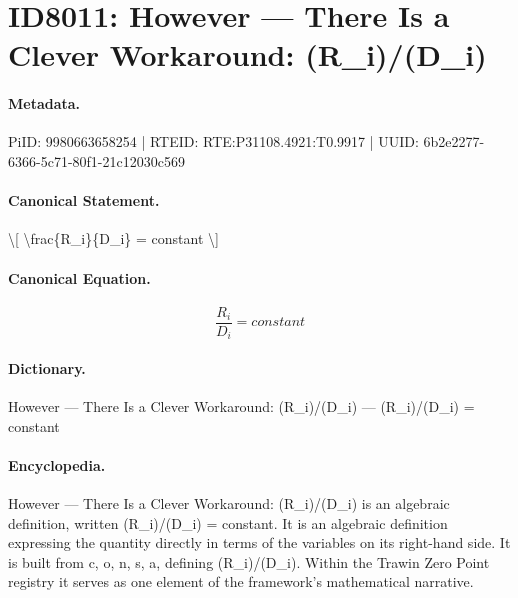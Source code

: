 \section*{ID8011: However — There Is a Clever Workaround: (R\_i)/(D\_i)}
\paragraph{Metadata.}
PiID: 9980663658254 | RTEID: RTE:P31108.4921:T0.9917 | UUID: 6b2e2277-6366-5c71-80f1-21c12030c569

\paragraph{Canonical Statement.}
\textbackslash{}[ \textbackslash{}frac\{R\_i\}\{D\_i\} = constant \textbackslash{}]

\paragraph{Canonical Equation.}
\[
\frac{R_i}{D_i} = constant
\]

\paragraph{Dictionary.}
However — There Is a Clever Workaround: (R\_i)/(D\_i) — (R\_i)/(D\_i) = constant

\paragraph{Encyclopedia.}
However — There Is a Clever Workaround: (R\_i)/(D\_i) is an algebraic definition, written (R\_i)/(D\_i) = constant. It is an algebraic definition expressing the quantity directly in terms of the variables on its right-hand side. It is built from c, o, n, s, a, defining (R\_i)/(D\_i). Within the Trawin Zero Point registry it serves as one element of the framework's mathematical narrative.
